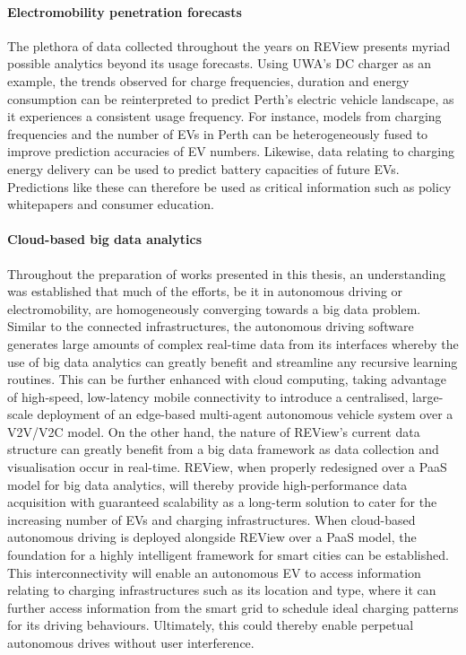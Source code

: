\paragraph{Electromobility penetration forecasts} The plethora of data collected throughout the years on REView presents myriad possible analytics beyond its usage forecasts. Using UWA's DC charger as an example, the trends observed for charge frequencies, duration and energy consumption can be reinterpreted to predict Perth's electric vehicle landscape, as it experiences a consistent usage frequency. For instance, models from charging frequencies and the number of EVs in Perth can be heterogeneously fused to improve prediction accuracies of EV numbers. Likewise, data relating to charging energy delivery can be used to predict battery capacities of future EVs. Predictions like these can therefore be used as critical information such as policy whitepapers and consumer education.   %

\paragraph{Cloud-based big data analytics} Throughout the preparation of works presented in this thesis, an understanding was established that much of the efforts, be it in autonomous driving or electromobility, are homogeneously converging towards a big data problem. Similar to the connected infrastructures, the autonomous driving software generates large amounts of complex real-time data from its interfaces whereby the use of big data analytics can greatly benefit and streamline any recursive learning routines. This can be further enhanced with cloud computing, taking advantage of high-speed, low-latency mobile connectivity to introduce a centralised, large-scale deployment of an edge-based multi-agent autonomous vehicle system over a V2V/V2C model. On the other hand, the nature of REView's current data structure can greatly benefit from a big data framework as data collection and visualisation occur in real-time. REView, when properly redesigned over a PaaS model for big data analytics, will thereby provide high-performance data acquisition with guaranteed scalability as a long-term solution to cater for the increasing number of EVs and charging infrastructures. When cloud-based autonomous driving is deployed alongside REView over a PaaS model, the foundation for a highly intelligent framework for smart cities can be established. This interconnectivity will enable an autonomous EV to access information relating to charging infrastructures such as its location and type, where it can further access information from the smart grid to schedule ideal charging patterns for its driving behaviours. Ultimately, this could thereby enable perpetual autonomous drives without user interference. 

